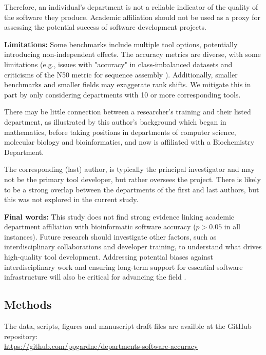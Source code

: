 \documentclass[fleqn,10pt,doc,onecolumn]{SelfArx}%
\begin{document}
Therefore, an individual’s department is not a reliable indicator of the
quality of the software they produce. Academic affiliation should not
be used as a proxy for assessing the potential success of software
development projects.

\textbf{Limitations:} Some benchmarks include multiple tool options,
potentially introducing non-independent effects. The accuracy metrics
are diverse, with some limitations (e.g., issues with "accuracy" in
class-imbalanced datasets \cite{luque2019impact} and criticisms of the
N50 metric for sequence assembly \cite{xie2021pdr}). Additionally,
smaller benchmarks and smaller fields may exaggerate rank shifts. We
mitigate this in part by only considering departments with 10 or more
corresponding tools. 


There may be little connection between a researcher’s training and
their listed department, as illustrated by this author’s background
which began in mathematics, before taking positions in departments of
computer science, molecular biology and bioinformatics, and now is
affiliated with a Biochemistry Department.

The corresponding (last) author, is typically the principal investigator and
may not be the primary tool developer, but rather oversees the
project. There is likely to be a strong overlap between the departments of the first
and last authors, but this was not explored in the current study.

\textbf{Final words:} This study does not find strong evidence linking
academic department affiliation with bioinformatic software
accuracy ($p>0.05$ in all instances). Future research should investigate other factors, such as
interdisciplinary collaborations and developer training, to understand
what drives high-quality tool development. Addressing potential biases
against interdisciplinary work \cite{bromham2016interdisciplinary} and ensuring long-term support for
essential software infrastructure will also be critical for advancing the
field \cite{siepel2019challenges}.



\subsection*{Methods}

The data, scripts, figures and manuscript draft files are availble at the GitHub repository:\\
\href{https://github.com/ppgardne/departments-software-accuracy}{https://github.com/ppgardne/departments-software-accuracy}
\end{document}
